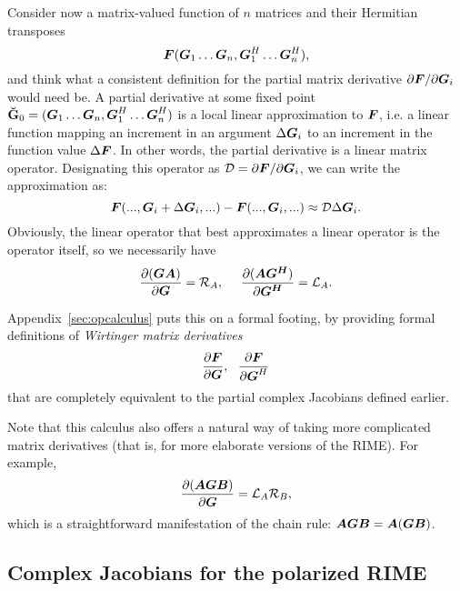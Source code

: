 \documentclass[useAMS,usenatbib]{mn2e}
\newcommand{\mat}[1]{{\bmath{#1}}}
\newcommand{\AUGx}[1]{\mathbf{\breve{#1}}}
\newcommand{\GGg}{\AUGx{G}}
\newcommand{\Rop}[1]{\mathcal{R}_{{#1}}}
\newcommand{\Lop}[1]{\mathcal{L}_{{#1}}}
\numberwithin{equation}{section}
\begin{document}
{Consider now a matrix-valued function of $n$ matrices and their Hermitian transposes
\begin{equation}
\mat{F}(\mat{G}_1\dots\mat{G}_n,\mat{G}^H_1\dots\mat{G}^H_n),
\end{equation}
and think what a consistent definition for the partial matrix derivative $\partial\mat{F}/\partial\mat{G}_i$ 
would need be. A partial derivative at some fixed point $\GGg_0 = (\mat{G}_1\dots\mat{G}_n,\mat{G}^H_1\dots\mat{G}^H_n)$
is a local linear approximation to $\mat{F}$, i.e. a linear function mapping an increment 
in an argument $\Delta\mat{G}_i$ to an increment in the function value $\Delta\mat{F}$. In other words, the partial 
derivative is a linear matrix operator. Designating this operator as $\mathcal{D}=\partial\mat{F}/\partial\mat{G}_i$, we 
can write the approximation as:
\begin{equation}
\mat{F}(...,\mat{G}_i+\Delta\mat{G}_i,...) - \mat{F}(...,\mat{G}_i,...) \approx \mathcal{D} \Delta\mat{G}_i.
\end{equation}
Obviously, the linear operator that best approximates a linear operator is the operator itself, so we necessarily have
\begin{equation}
\frac{\partial(\mat{GA})}{\partial{\mat{G}}} = \Rop{A},~~~~\frac{\partial(\mat{AG^H})}{\partial{\mat{G^H}}} = \Lop{A}.
\end{equation}

Appendix~\ref{sec:opcalculus} puts this on a formal footing, by providing formal definitions of \emph{Wirtinger matrix derivatives}
\begin{equation}
\frac{\partial\mat{F}}{\partial{\mat{G}}}, ~~
\frac{\partial\mat{F}}{\partial{\mat{G}^H}} 
\end{equation}
that are completely equivalent to the partial complex Jacobians defined earlier. 

Note that this calculus also offers a natural way of taking more
complicated matrix derivatives (that is, for more elaborate versions of the RIME). For example,
\begin{equation}
\frac{\partial(\mat{AGB})}{\partial{\mat{G}}} = \Lop{A}\Rop{B},
\end{equation}
which is a straightforward manifestation of the chain rule: $\mat{AGB}=\mat{A}(\mat{GB})$.}

\subsection{Complex Jacobians for the polarized RIME}
\end{document}
